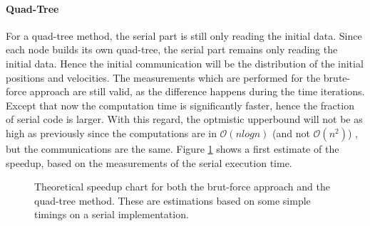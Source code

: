 \paragraph{Quad-Tree}
For a quad-tree method, the serial part is still only reading the initial data. Since each node builds its own quad-tree, the serial part remains only reading the initial data. Hence the initial communication will be the distribution of the initial positions and velocities. The measurements which are performed for the brute-force approach are still valid, as the difference happens during the time iterations. Except that now the computation time is significantly faster, hence the fraction of serial code is larger.  With this regard, the optmistic upperbound will not be as high as previously since the computations are in $\mathcal{O}(nlogn)$ (and not $\mathcal{O}(n^2)$) , but the communications are the same. Figure \ref{fig:th_su} shows a first estimate of the speedup, based on the measurements of the serial execution time.\\

\begin{figure}[H]

\caption{Theoretical speedup chart for both the brut-force approach and the quad-tree method. These are estimations based on some simple timings on a serial implementation.}
\label{fig:th_su}
\end{figure}


